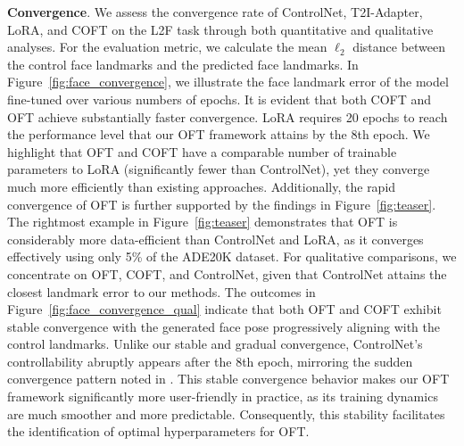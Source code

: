 \textbf{Convergence}. We assess the convergence rate of ControlNet, T2I-Adapter, LoRA, and COFT on the L2F task through both quantitative and qualitative analyses. For the evaluation metric, we calculate the mean $\ell_2$ distance between the control face landmarks and the predicted face landmarks. In Figure~\ref{fig:face_convergence}, we illustrate the face landmark error of the model fine-tuned over various numbers of epochs. It is evident that both COFT and OFT achieve substantially faster convergence. LoRA requires 20 epochs to reach the performance level that our OFT framework attains by the 8th epoch. We highlight that OFT and COFT have a comparable number of trainable parameters to LoRA (significantly fewer than ControlNet), yet they converge much more efficiently than existing approaches. Additionally, the rapid convergence of OFT is further supported by the findings in Figure~\ref{fig:teaser}. The rightmost example in Figure~\ref{fig:teaser} demonstrates that OFT is considerably more data-efficient than ControlNet and LoRA, as it converges effectively using only 5\% of the ADE20K dataset. For qualitative comparisons, we concentrate on OFT, COFT, and ControlNet, given that ControlNet attains the closest landmark error to our methods. The outcomes in Figure~\ref{fig:face_convergence_qual} indicate that both OFT and COFT exhibit stable convergence with the generated face pose progressively aligning with the control landmarks. Unlike our stable and gradual convergence, ControlNet’s controllability abruptly appears after the 8th epoch, mirroring the sudden convergence pattern noted in \cite{zhang2023adding}. This stable convergence behavior makes our OFT framework significantly more user-friendly in practice, as its training dynamics are much smoother and more predictable. Consequently, this stability facilitates the identification of optimal hyperparameters for OFT.

